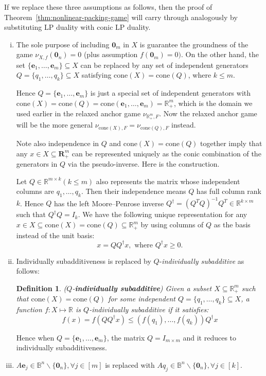 \documentclass[11pt]{article}\usepackage[]{graphicx}\usepackage[]{xcolor}
\newtheorem{deff}{Definition}
\begin{document}
If we replace these three assumptions as follows, then the proof of Theorem~\ref{thm:nonlinear-packing-game} will carry through analogously by substituting LP duality with conic LP duality. 
\begin{enumerate}[(i)]
\item The sole purpose of including $\mathbf{0}_m$ in $X$ is guarantee the groundness of the game $\nu_{X, f}(\mathbf{0}_n)=0$ (plus assumption $f(\mathbf{0}_m)=0)$. On the other hand, the set $\{\mathbf{e}_1,\dots, \mathbf{e}_m\}\subseteq X$ can be replaced by any set of independent generators $Q=\{q_1,\dots, q_k\}\subseteq X$ satisfying $\text{cone}(X)=\text{cone}(Q)$, where $k\le m$. 

Hence $Q=\{\mathbf{e}_1,\dots, \mathbf{e}_m\}$ is just a special set of independent generators with $\text{cone}(X)=\text{cone}(Q)=\text{cone}\left(\mathbf{e}_1,\dots, \mathbf{e}_m\right)=\mathbb{R}^m_{+}$, which is the domain we used earlier in the relaxed anchor game $\nu_{\mathbb{R}^m_{+}, F}$. Now the relaxed anchor game will be the more general $\nu_{\text{cone}(X), F}=\nu_{\text{cone}(Q), F}$ instead.

Note also independence in $Q$ and $\text{cone}(X)=\text{cone}(Q)$ together imply that any $x\in X\subseteq \mathbf{R}^m_{+}$ can be represented uniquely as the conic combination of the generators in $Q$ via the pseudo-inverse. Here is the construction. 

Let $Q\in\mathbb{R}^{m\times k} (k\le m)$ also represents the matrix whose independent columns are $q_1,\dots, q_k$. Then their independence means $Q$ has full column rank $k$. Hence $Q$ has the left Moore–Penrose inverse $Q^{\dagger}=(Q^TQ)^{-1}Q^T\in\mathbb{R}^{k\times m}$ such that $Q^{\dagger}Q=I_k$. We have the following unique representation for any $x\in X\subseteq \text{cone}(X)=\text{cone}(Q)\subseteq \mathbb{R}^m_{+}$ by using columns of $Q$ as the basis instead of the unit basis:
\begin{equation}\label{eq:x-rep-Q}
x=QQ^{\dagger}x, \text{ where } Q^{\dagger}x\ge 0.
\end{equation}
\item Individually subadditiveness is replaced by $Q$-\emph{individually subadditive} as follows:
 \begin{deff}\label{deff:indiv-supadd_Q} ($Q$-\textbf{individually subadditive}) Given a subset $X\subseteq \mathbb{R}^m_{+}$ such that $\text{cone}(X)=\text{cone}(Q)$ for some independent $Q=\{q_1,\dots, q_k\}\subseteq X$, a function $f: X\mapsto \mathbb{R}$ is $Q$-\emph{individually subadditive} if it satisfies:
\begin{equation*}
f(x)=f\left(QQ^{\dagger}x\right)\le \left(f(q_1),\dots, f(q_k)\right)Q^{\dagger}x
\end{equation*}
\end{deff}
Hence when $Q=\{\mathbf{e}_1,\dots, \mathbf{e}_m\}$, the matrix $Q=I_{m\times m}$ and it reduces to individually subadditiveness. 
\item $A\mathbf{e}_j\in \mathbb{B}^n\backslash \{\mathbf{0}_n\}, \forall j\in [m]$ is replaced with $Aq_j\in \mathbb{B}^n\backslash \{\mathbf{0}_n\}, \forall j\in [k]$.
\end{enumerate}
\end{document}
